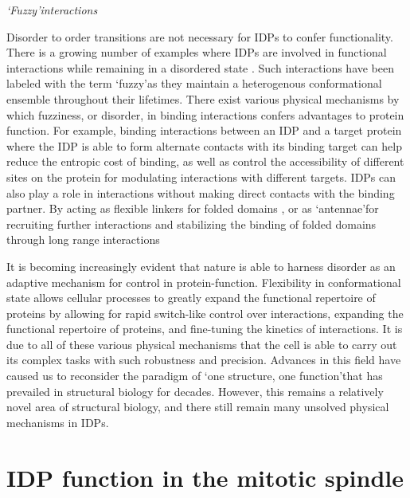 \pagebreak

{\it \lq Fuzzy\rq interactions}

\par Disorder to order transitions are not necessary for IDPs to confer functionality. There is a growing number of examples where IDPs are involved in functional interactions while remaining in a disordered state \cite{tompa2008fuzzy}. Such interactions have been labeled with the term \lq fuzzy\rq as they maintain a heterogenous conformational ensemble throughout their lifetimes. There exist various physical mechanisms by which fuzziness, or disorder, in binding interactions confers advantages to protein function. For example, binding interactions between an IDP and a target protein where the IDP is able to form alternate contacts with its binding target can help reduce the entropic cost of binding, as well as control the accessibility of different sites on the protein for modulating interactions with different targets. \cite{graham2001tcf4, fontes2000structural} IDPs can also play a role in interactions without making direct contacts with the binding partner.  By acting as flexible linkers for folded domains \cite{bhattacharyya2006ste5}, or as \lq antennae\rq for \cite{sigalov2004homooligomerization} recruiting further interactions and stabilizing the binding of folded domains through long range interactions \cite{zor2002roles, yu1994structural} 

It is becoming increasingly evident that nature is able to harness disorder as an adaptive mechanism for control in protein-function. Flexibility in conformational state allows cellular processes to greatly expand the functional repertoire of proteins by allowing for rapid switch-like control over interactions, expanding the functional repertoire of proteins, and fine-tuning the kinetics of interactions.  It is due to all of these various physical mechanisms that the cell is able to carry out its complex tasks with such robustness and precision. Advances in this field have caused us to reconsider the paradigm of \lq one structure, one function\rq that has prevailed in structural biology for decades. However, this remains a relatively novel area of structural biology, and there still remain many unsolved physical mechanisms in IDPs.

\section{IDP function in the mitotic spindle}
 
